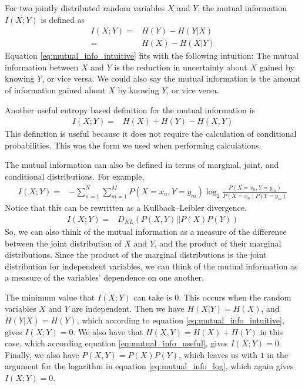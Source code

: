\documentclass[a4paper,12pt]{article}
\theoremstyle{definition}
\begin{document}
For two jointly distributed random variables $X$ and $Y$, the mutual information $I(X;Y)$ is defined as
\begin{align}\label{eq:mutual_info_intuitive}
I(X;Y)  =& H(Y) - H(Y|X) \\
        =& H(X) - H(X|Y)
\end{align}
Equation \ref{eq:mutual_info_intuitive} fits with the following intuition: The mutual information between $X$ and $Y$ is the reduction in uncertainty about $X$ gained by knowing $Y$, or vice versa. We could also say the mutual information is the amount of information gained about $X$ by knowing $Y$, or vice versa.

Another useful entropy based definition for the mutual information is
\begin{align}\label{eq:mutual_info_useful}
I(X;Y)  =& H(X) + H(Y) - H(X,Y)
\end{align}
This definition is useful because it does not require the calculation of conditional probabilities. This was the form we used when performing calculations.

The mutual information can also be defined in terms of marginal, joint, and conditional distributions. For example,
\begin{align}\label{eq:mutual_info_log}
I(X;Y)  =& -\sum_{n=1}^N \sum_{m=1}^M P(X=x_n, Y=y_m) \log _2 \frac{P(X=x_n, Y=y_m)}{P(X=x_n) P(Y=y_m)}
\end{align}
Notice that this can be rewritten as a Kullback–Leibler divergence.
\begin{align}
I(X;Y)  =& D_{KL}(P(X,Y)|| P(X)P(Y))
\end{align}
So, we can also think of the mutual information as a measure of the difference between the joint distribution of $X$ and $Y$, and the product of their marginal distributions. Since the product of the marginal distributions is the joint distribution for independent variables, we can think of the mutual information as a measure of the variables' dependence on one another.

The minimum value that $I(X;Y)$ can take is $0$. This occurs when the random variables $X$ and $Y$ are independent. Then we have $H(X|Y) = H(X)$, and $H(Y|X) = H(Y)$, which according to equation \ref{eq:mutual_info_intuitive}, gives $I(X;Y) = 0$. We also have that $H(X,Y) = H(X) + H(Y)$ in this case, which according equation \ref{eq:mutual_info_useful}, gives $I(X;Y) = 0$. Finally, we also have $P(X,Y) = P(X)P(Y)$, which leaves us with $1$ in the argument for the logarithm in equation \ref{eq:mutual_info_log}, which again gives $I(X;Y) = 0$.
\end{document}
